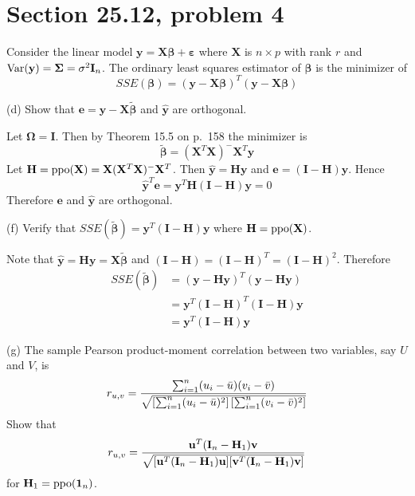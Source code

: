 \section{Section 25.12, problem 4}
Consider the linear model
$\mathbf y=\mathbf X\bm\beta+\bm\varepsilon$ where $\mathbf X$
is $n\times p$ with rank $r$ and $\mathop{\rm Var}(\mathbf y)
=\bm\Sigma=\sigma^2\mathbf I_n$.
The ordinary least squares estimator of $\bm\beta$ is the
minimizer of
\[
SSE(\bm\beta)=(\mathbf y-\mathbf X\bm\beta)^T
(\mathbf y-\mathbf X\bm\beta)
\]

\bigskip
\noindent
(d) Show that $\mathbf e=\mathbf y-\mathbf X\bm{\tilde\beta}$
and $\mathbf{\hat y}$ are orthogonal.

\bigskip
\noindent
Let $\bm\Omega=\mathbf I$.
Then by Theorem 15.5 on p.\ 158 the minimizer is
\[
\bm{\tilde\beta}=(\mathbf X^T\mathbf X)^{-{}}\mathbf X^T\mathbf y
\]
Let $\mathbf H=\mathop{\rm ppo}(\mathbf X)=
\mathbf X(\mathbf X^T\mathbf X)^{-{}}\mathbf X^T$.
Then
$\mathbf{\hat y}=\mathbf{Hy}$ and
$\mathbf e=(\mathbf I-\mathbf H)\mathbf y$.
Hence
\[
\mathbf{\hat y}^T\mathbf e
=\mathbf y^T\mathbf H(\mathbf I-\mathbf H)\mathbf y=0
\]
Therefore $\mathbf e$ and $\mathbf{\hat y}$ are orthogonal.

\bigskip
\noindent
(f) Verify that
$SSE(\bm{\tilde\beta})=\mathbf y^T(\mathbf I-\mathbf H)\mathbf y$
where $\mathbf H=\mathop{\rm ppo}(\mathbf X)$.

\bigskip
\noindent
Note that $\mathbf{\hat y}=\mathbf{Hy}=\mathbf X\bm{\tilde\beta}$
and $(\mathbf I-\mathbf H)=(\mathbf I-\mathbf H)^T
=(\mathbf I-\mathbf H)^2$.
Therefore
\begin{align*}
SSE(\bm{\tilde\beta})
&=(\mathbf y-\mathbf{Hy})^T(\mathbf y-\mathbf{Hy})\\
&=\mathbf y^T(\mathbf I-\mathbf H)^T(\mathbf I-\mathbf H)\mathbf y\\
&=\mathbf y^T(\mathbf I-\mathbf H)\mathbf y
\end{align*}

\bigskip
\noindent
(g) The sample Pearson product-moment correlation between two
variables, say $U$ and $V$, is
\[
r_{u,v}={
\sum_{i=1}^n(u_i-\bar u)(v_i-\bar v)
\over
\sqrt{
\left[\sum_{i=1}^n(u_i-\bar u)^2\right]
\left[\sum_{i=1}^n(v_i-\bar v)^2\right]
}
}
\]
Show that
\[
r_{u,v}={
\mathbf u^T(\mathbf I_n-\mathbf H_1)\mathbf v
\over
\sqrt{
[\mathbf u^T(\mathbf I_n-\mathbf H_1)\mathbf u]
[\mathbf v^T(\mathbf I_n-\mathbf H_1)\mathbf v]
}
}
\]
for $\mathbf H_1=\mathop{\rm ppo}(\mathbf 1_n)$.

